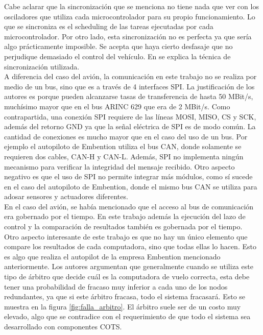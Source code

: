 Cabe aclarar que la sincronización que se menciona no tiene nada que ver con los osciladores que utiliza cada microcontrolador para su propio funcionamiento. Lo que se sincroniza es el scheduling de las tareas ejecutadas por cada microcontrolador. Por otro lado, esta sincronización no es perfecta ya que sería algo prácticamente imposible. Se acepta que haya cierto desfasaje que no perjudique demasiado el control del vehículo. En \cite{hiergeist2018implementation} se explica la técnica de sincronización utilizada.\\

A diferencia del caso del avión, la comunicación en este trabajo no se realiza por medio de un bus, sino que es a través de 4 interfaces SPI. La justificación de los autores es porque pueden alcanzarse tasas de transferencia de hasta 50 MBit/s, muchísimo mayor que en el bus ARINC 629 que era de 2 MBit/s. Como contrapartida, una conexión SPI requiere de las líneas MOSI, MISO, CS y SCK, además del retorno GND ya que la señal eléctrica de SPI es de modo común. La cantidad de conexiones es mucho mayor que en el caso del uso de un bus. Por ejemplo el autopiloto de Embention utiliza el bus CAN, donde solamente se requieren dos cables, CAN-H y CAN-L. Además, SPI no implementa ningún mecanismo para verificar la integridad del mensaje recibido. Otro aspecto negativo es que el uso de SPI no permite integrar más módulos, como sí sucede en el caso del autopiloto de Embention, donde el mismo bus CAN se utiliza para adosar sensores y actuadores diferentes.\\

En el caso del avión, se había mencionado que el acceso al bus de comunicación era gobernado por el tiempo. En este trabajo además la ejecución del lazo de control y la comparación de resultados también es gobernada por el tiempo.\\

Otro aspecto interesante de este trabajo es que no hay un único elemento que compare los resultados de cada computadora, sino que todas ellas lo hacen. Esto es algo que realiza el autopilot de la empresa Embention mencionado anteriormente. Los autores argumentan que generalmente cuando se utiliza este tipo de árbitro que decide cuál es la computadora de vuelo correcta, esta debe tener una probabilidad de fracaso muy inferior a cada uno de los nodos redundantes, ya que si este árbitro fracasa, todo el sistema fracasará. Esto se muestra en la figura \ref{fig:falla_arbitro}. El árbitro suele ser de un costo muy elevado, algo que se contradice con el requerimiento de que todo el sistema sea desarrollado con componentes COTS.\\

